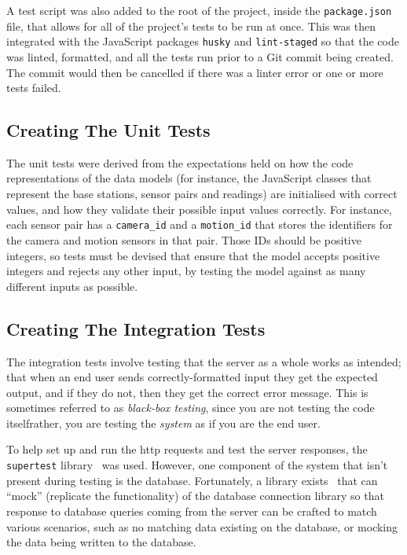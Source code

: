 A test script was also added to the root of the project, inside the
\texttt{package.json} file, that allows for all of the project's tests to be
run at once. This was then integrated with the JavaScript packages
\texttt{husky} and \texttt{lint-staged} so that the code was linted,
formatted, and all the tests run prior to a Git commit being created. The
commit would then be cancelled if there was a linter error or one or more
tests failed.

\subsection{Creating The Unit Tests}
The unit tests were derived from the expectations held on how the code
representations of the data models (for instance, the JavaScript classes that
represent the base stations, sensor pairs and readings) are initialised with
correct values, and how they validate their possible input values correctly.
For instance, each sensor pair has a \texttt{camera\_id} and a
\texttt{motion\_id} that stores the identifiers for the camera and motion
sensors in that pair. Those IDs should be positive integers, so tests must be
devised that ensure that the model accepts positive integers and rejects any
other input, by testing the model against as many different inputs as
possible.

\subsection{Creating The Integration Tests}

The integration tests involve testing that the server as a whole works as
intended; that when an end user sends correctly-formatted input they get the
expected output, and if they do not, then they get the correct error message.
This is sometimes referred to as \textit{black-box testing}, since you are
not testing the code itself\textemdash{}rather, you are testing the
\textit{system} as if you are the end user.

To help set up and run the \acrshort{http} requests and test the server
responses, the \texttt{supertest} library~\cite{supertest} was used. However,
one component of the system that isn't present during testing is the
database. Fortunately, a library exists~\cite{mock-knex} that can ``mock''
(replicate the functionality) of the database connection library so that
response to database queries coming from the server can be crafted to match
various scenarios, such as no matching data existing on the database, or
mocking the data being written to the database.


